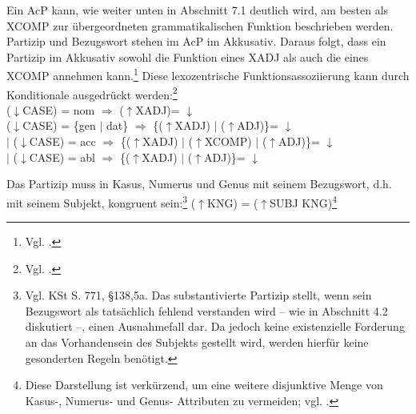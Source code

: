 \documentclass[12pt,a4paper]{article}
\begin{document}
Ein AcP kann, wie weiter unten in Abschnitt 7.1 deutlich wird, am besten als XCOMP zur übergeordneten grammatikalischen Funktion beschrieben werden. Partizip und Bezugswort stehen im AcP im Akkusativ. Daraus folgt, dass ein Partizip im Akkusativ sowohl die Funktion eines XADJ als auch die eines XCOMP annehmen kann.\footnote{Vgl. \cite[48]{Skript}.} Diese lexozentrische Funktionsassoziierung kann durch Konditionale ausgedrückt werden:\footnote{Vgl. \cite[48]{Skript}.} \\
($\downarrow$CASE) = nom $\Rightarrow$ ($\uparrow$XADJ)= $\downarrow$ \\
($\downarrow$CASE) = \{gen $\mid$ dat\} $\Rightarrow$ \{($\uparrow$XADJ) $\mid$ ($\uparrow$ADJ)\}= $\downarrow$ \\
$\mid$ ($\downarrow$CASE) = acc $\Rightarrow$ \{($\uparrow$XADJ) $\mid$ ($\uparrow$XCOMP) $\mid$ ($\uparrow$ADJ)\}= $\downarrow$ \\
$\mid$ ($\downarrow$CASE) = abl $\Rightarrow$ \{($\uparrow$XADJ) $\mid$ ($\uparrow$ADJ)\}= $\downarrow$ 

Das Partizip muss in Kasus, Numerus und Genus mit seinem Bezugswort, d.h. mit seinem Subjekt, kongruent sein:\footnote{Vgl. KSt S. 771, §138,5a. Das substantivierte Partizip stellt, wenn sein Bezugswort als tatsächlich fehlend verstanden wird -- wie in Abschnitt 4.2 diskutiert --, einen Ausnahmefall dar. Da jedoch keine existenzielle Forderung an das Vorhandensein des Subjekts gestellt wird, werden hierfür keine gesonderten Regeln benötigt.} 
($\uparrow$KNG) = ($\uparrow$SUBJ KNG)\footnote{Diese Darstellung ist verkürzend, um eine weitere disjunktive Menge von Kasus-, Numerus- und Genus- Attributen zu vermeiden; vgl. \cite[49]{Skript}.}
\end{document}
